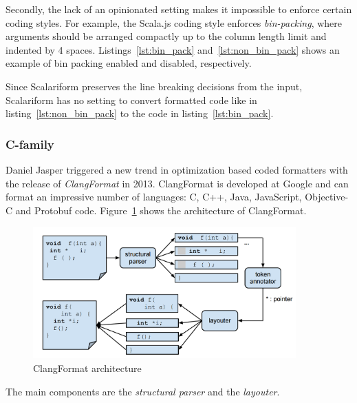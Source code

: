 Secondly, the lack of an opinionated setting makes it impossible to enforce certain coding styles.
For example, the Scala.js coding style enforces \emph{bin-packing}, where arguments should be arranged compactly up to the column length limit and indented by 4 spaces.
Listings~\ref{lst:bin_pack} and~\ref{lst:non_bin_pack} shows an example of bin packing enabled and disabled, respectively.

\begin{minipage}{.45\textwidth}
  
\end{minipage}
\hfil
\begin{minipage}{.45\textwidth}
  
\end{minipage}

Since Scalariform preserves the line breaking decisions from the input,
Scalariform has no setting to convert formatted code like in listing~\ref{lst:non_bin_pack} to the code in listing~\ref{lst:bin_pack}.

\subsubsection{C-family}
Daniel Jasper triggered a new trend in optimization based coded formatters with the release of \emph{ClangFormat}\autocite{jasper_clang-format_2014} in 2013.
ClangFormat is developed at Google and can format an impressive number of languages: C, C++, Java, JavaScript, Objective-C and Protobuf code.
Figure~\ref{fig:clang_format} shows the architecture of ClangFormat.
\begin{figure}
  \centering
  \includegraphics[width=0.9\textwidth]{img/clang-format.png}
  \caption{ClangFormat architecture}
  \label{fig:clang_format}
\end{figure}
The main components are the \emph{structural parser} and the \emph{layouter}.

